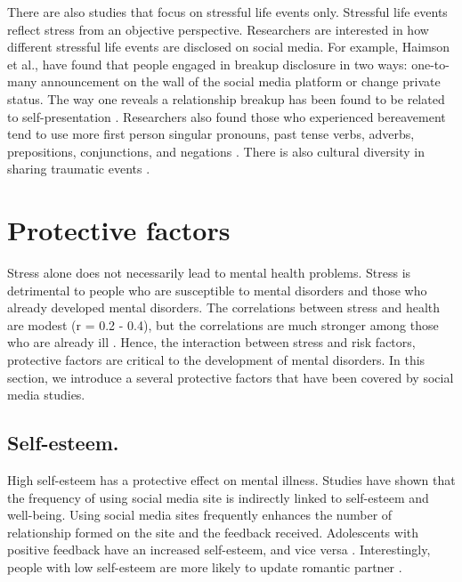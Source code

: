 There are also studies that focus on stressful life events only. Stressful life events reflect stress from an objective perspective. Researchers are interested in how different stressful life events are disclosed on social media. For example, Haimson et al., have found that people engaged in breakup disclosure in two ways: one-to-many announcement on the wall of the social media platform or change private status. The way one reveals a relationship breakup has been found to be related to self-presentation \cite{haimson2018relationship}. Researchers also found those who experienced bereavement tend to use more first person singular pronouns, past tense verbs, adverbs, prepositions, conjunctions, and negations \cite{brubaker2012grief}. There is also cultural diversity in sharing traumatic events \cite{freitag2011talking}. 


\section{Protective factors}
Stress alone does not necessarily lead to mental health problems. Stress is detrimental to people who are susceptible to mental disorders and those who already developed mental disorders. The correlations between stress and health are modest (r =  0.2 - 0.4), but the correlations are much stronger among those who are already ill \cite{aldwin2004interface}. Hence, the interaction between stress and risk factors, protective factors are critical to the development of mental disorders. In this section, we introduce a several protective factors that have been covered by social media studies.

\subsection{Self-esteem.}
High self-esteem has a protective effect on mental illness. Studies have shown that the frequency of using social media site is indirectly linked to self-esteem and well-being. Using social media sites frequently enhances the number of relationship formed on the site and the feedback received. Adolescents with positive feedback have an increased self-esteem, and vice versa \cite{valkenburg2006friend}. Interestingly, people with low self-esteem are more likely to update romantic partner \cite{marshall_big_2015}.

